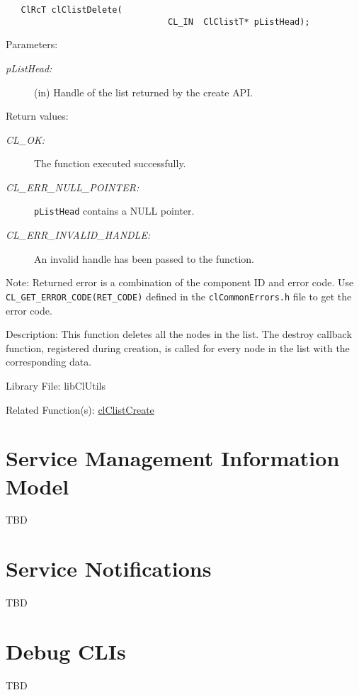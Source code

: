 \begin{flushleft}
\begin{Desc}
\footnotesize\begin{verbatim}   ClRcT clClistDelete(
                     			CL_IN  ClClistT* pListHead);
\end{verbatim}
\normalsize
\end{Desc}
\begin{Desc}
\item[Parameters:]
\begin{description}
\item[{\em p\-List\-Head:}](in) Handle of the list returned by the create API.\end{description}
\end{Desc}
\begin{Desc}
\item[Return values:]
\begin{description}
\item[{\em CL\_\-OK:}]The function executed successfully. 
\item[{\em CL\_\-ERR\_\-NULL\_\-POINTER:}]{\tt{pListHead}} contains a NULL pointer. 
\item[{\em CL\_\-ERR\_\-INVALID\_\-HANDLE:}]An invalid handle has been passed to the function.\end{description}
\end{Desc}
\begin{Desc}
\item[Note:]Returned error is a combination of the component ID and error code. Use {\tt{CL\_\-GET\_\-ERROR\_\-CODE(RET\_\-CODE)}} defined in the
{\tt{clCommonErrors.h}} file to get the error code.\end{Desc}
\begin{Desc}
\item[Description:]This function deletes all the nodes in the list. The destroy callback function, registered during creation, is called for every node in the
list with the corresponding data.\end{Desc}
\begin{Desc}
\item[Library File:]lib\-Cl\-Utils\end{Desc}
\begin{Desc}
\item[Related Function(s):]\hyperlink{pagecl101}{cl\-Clist\-Create} \end{Desc}


\chapter{Service Management Information Model}
TBD
\chapter{Service Notifications}
TBD
\chapter{Debug CLIs}
TBD
\end{flushleft}